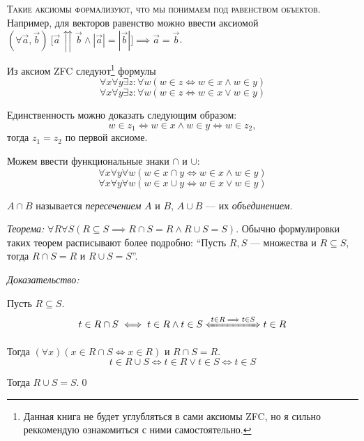 \textsc{Такие аксиомы формализуют, что мы понимаем под равенством объектов.}
Например, для векторов равенство можно ввести аксиомой
$(\forall \vec{a},\vec{b})~
	\big[\vec{a}\upuparrows\vec{b}\land|\vec{a}|=|\vec{b}|\big]
	\implies \vec{a}=\vec{b}$.

Из аксиом ZFC следуют\footnote{
	Данная книга не будет углубляться в сами аксиомы ZFC, но я сильно реккомендую
	ознакомиться с ними самостоятельно.
} формулы
\[
	\forall x\forall y\exists z:\forall w(w\in z\iff w\in x\land w\in y)
\]
\[
	\forall x\forall y\exists z:\forall w(w\in z\iff w\in x\lor w\in y)
\]

Единственность можно доказать следующим образом:
\[
	w\in z_1\iff w\in x\land w\in y\iff w\in z_2,
\]
тогда $z_1=z_2$ по первой аксиоме.

Можем ввести функциональные знаки $\cap$ и $\cup$:
\[
	\forall x\forall y\forall w(w\in x\cap y\iff w\in x\land w\in y)
\]
\[
	\forall x\forall y\forall w(w\in x\cup y\iff w\in x\lor w\in y)
\]

$A\cap B$ называется {\it пересечением} $A$ и $B$,
$A\cup B$ --- их {\it объединением}.

\vspace{1em}
{\it Теорема:} ${\forall R\forall S(R\subseteq S\implies R\cap S=R\land R\cup S=S)}$.
Обычно формулировки таких теорем расписывают более подробно:
``Пусть $R,S$ --- множества и $R\subseteq S$, тогда $R\cap S=R$ и $R\cup S=S$''.

{\it Доказательство:}

Пусть $R\subseteq S$.
\[
	t\in R\cap S\iff t\in R\land t\in S\xLeftrightarrow{t\in R\implies t\in S} t\in R
\]

Тогда $(\forall x)(x\in R\cap S\iff x\in R)$ и $R\cap S=R$.
\[
	t\in R\cup S\iff t\in R\lor t\in S\iff t\in S
\]

Тогда $R\cup S=S$.\qed


